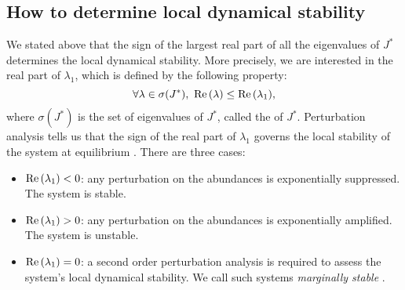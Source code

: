 \documentclass[12pt, titlepage]{report}
\begin{document}

\subsection{How to determine local dynamical stability}\label{sec : how to determine local dynamical stability}
We stated above that the sign of the largest real part of all the eigenvalues of $J^*$ determines the local dynamical stability.
More precisely, we are interested in the real part of $\lambda_1$, which is defined by the following property:
\begin{equation}
{\forall \lambda \in \sigma(J^*), \ \real{\lambda} \leq \real{\lambda_1}},
\end{equation}
where $\sigma(J^*)$ is the set of eigenvalues of $J^*$, called the  of $J^*$. Perturbation analysis tells us that the sign of the real part of $\lambda_1$ governs the local stability of the system at equilibrium \cite{strogatz_nonlinear_1994}. There are three cases:
\begin{itemize}
\item $\text{Re}\left(\lambda_1\right) < 0$: any perturbation on the abundances is exponentially suppressed. The system is stable.
\item $\text{Re}\left(\lambda_1\right) > 0$: any perturbation on the abundances is exponentially amplified. The system is unstable.
\item $\text{Re}\left(\lambda_1\right)=0$: a second order perturbation analysis is required to assess the system's local dynamical stability. We call such systems \textit{marginally stable} \cite{biroli_marginally_2018}.
\end{itemize}
\end{document}
